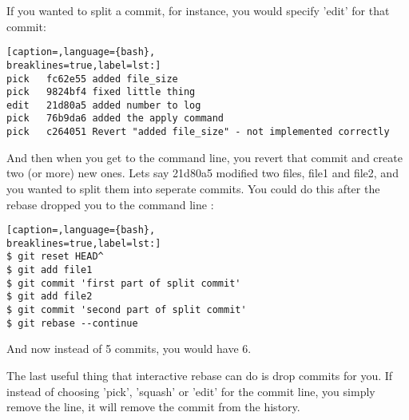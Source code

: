If you wanted to split a commit, for instance, you would specify 'edit' for
that commit:
\lstset{basicstyle=\scriptsize, numbers=none, captionpos=b, tabsize=4}
\begin{lstlisting}[caption=,language={bash},
breaklines=true,label=lst:]
pick   fc62e55 added file_size
pick   9824bf4 fixed little thing
edit   21d80a5 added number to log
pick   76b9da6 added the apply command
pick   c264051 Revert "added file_size" - not implemented correctly
\end{lstlisting}

And then when you get to the command line, you revert that commit and create
two (or more) new ones. Lets say 21d80a5 modified two files, file1 and file2,
and you wanted to split them into seperate commits. You could do this after the
rebase dropped you to the command line :
\lstset{basicstyle=\scriptsize, numbers=none, captionpos=b, tabsize=4}
\begin{lstlisting}[caption=,language={bash},
breaklines=true,label=lst:]
$ git reset HEAD^
$ git add file1
$ git commit 'first part of split commit'
$ git add file2
$ git commit 'second part of split commit'
$ git rebase --continue
\end{lstlisting}

And now instead of 5 commits, you would have 6.

The last useful thing that interactive rebase can do is drop commits for you.
If instead of choosing 'pick', 'squash' or 'edit' for the commit line, you
simply remove the line, it will remove the commit from the history.

